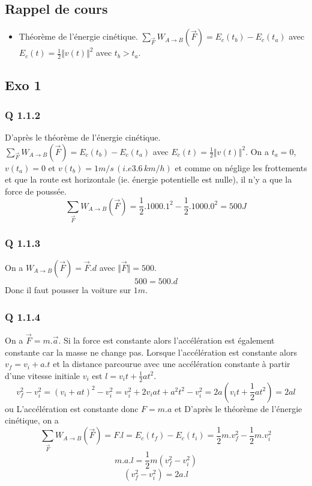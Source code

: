 \documentclass[]{book}
\theoremstyle{definition}
\begin{document}
\subsection*{Rappel de cours}
\begin{itemize}
\item Th\'eor\`eme de l'\'energie cin\'etique. $\sum_{\overrightarrow{F}} W_{A \to B}(\overrightarrow{F}) = E_c(t_b) - E_c(t_a)$ avec $E_c(t) = \frac{1}{2}\Vert v(t) \Vert^2$ avec $t_b>t_a$.
\end{itemize}


\subsection*{Exo 1}

\subsubsection*{Q 1.1.2}
D'apr\`es le th\'eor\`eme de l'\'energie cin\'etique. $\sum_{\overrightarrow{F}}W_{A \to B}(\overrightarrow{F}) = E_c(t_b) - E_c(t_a)$ avec $E_c(t) = \frac{1}{2}\Vert v(t) \Vert^2$. On a $t_a=0$, $v(t_a) = 0$ et $v(t_b) = 1m/s \,(i.e 3.6\, km/h)$ et comme on n\'eglige les frottements et que la route est horizontale (ie. \'energie potentielle est nulle), il n'y a que la force de pouss\'ee.\\
$$\sum_{\overrightarrow{F}}W_{A \to B}(\overrightarrow{F}) = \frac{1}{2}.1000.1^2 - \frac{1}{2}.1000.0^2 = 500J$$

\subsubsection*{Q 1.1.3}
On a $W_{A \to B}(\overrightarrow{F}) = \overrightarrow{F}.d$ avec $\Vert \overrightarrow{F} \Vert = 500$.
$$500 = 500.d$$
Donc il faut pousser la voiture sur $1m$.

\subsubsection*{Q 1.1.4}
On a $\overrightarrow{F} = m.\overrightarrow{a}$. Si la force est constante alors l'acc\'el\'eration est \'egalement constante car la masse ne change pas. Lorsque l'acc\'el\'eration est constante alors $v_f = v_i + a.t$ et la distance parcourue avec une acc\'el\'eration constante \`a partir d'une vitesse initiale $v_i$ est $l=v_it+\frac{1}{2}at^2$.
$$v_f^2 - v_i^2 = (v_i + at)^2 - v_i^2 = v_i^2 + 2 v_iat + a^2t^2 - v_i^2 = 2a(v_it + \frac{1}{2}at^2) = 2al$$
ou
L'acc\'el\'eration est constante donc $F = m.a$ et D'apr\`es le th\'eor\`eme de l'\'energie cin\'etique, on a
$$\sum_{\overrightarrow{F}}W_{A \to B}(\overrightarrow{F}) = F.l = E_c(t_f) - E_c(t_i) = \frac{1}{2}m.v_f^2 - \frac{1}{2}m.v_i^2$$
$$m.a.l = \frac{1}{2}m(v_f^2 - v_i^2)$$
$$(v_f^2 - v_i^2) = 2a.l$$
\end{document}

